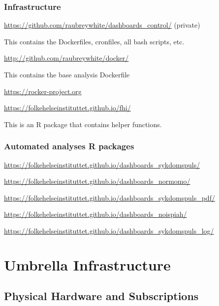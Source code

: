 \documentclass[12pt,]{article}
\begin{document}
\subsubsection{Infrastructure}\label{infrastructure}

\url{https://github.com/raubreywhite/dashboards_control/} (private)

This contains the Dockerfiles, cronfiles, all bash scripts, etc.

\url{http://github.com/raubreywhite/docker/}

This contains the base analysis Dockerfile

\url{https://rocker-project.org}

\url{https://folkehelseinstituttet.github.io/fhi/}

This is an R package that contains helper functions.

\subsubsection{Automated analyses R
packages}\label{automated-analyses-r-packages}

\url{https://folkehelseinstituttet.github.io/dashboards_sykdomspuls/}

\url{https://folkehelseinstituttet.github.io/dashboards_normomo/}

\url{https://folkehelseinstituttet.github.io/dashboards_sykdomspuls_pdf/}

\url{https://folkehelseinstituttet.github.io/dashboards_noispiah/}

\url{https://folkehelseinstituttet.github.io/dashboards_sykdomspuls_log/}

\section{Umbrella Infrastructure}\label{umbrella-infrastructure}

\subsection{Physical Hardware and
Subscriptions}\label{physical-hardware-and-subscriptions}
\end{document}
